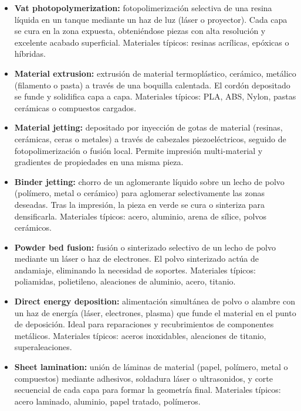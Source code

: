\begin{itemize}
  \item \textbf{Vat photopolymerization:}  
    fotopolimerización selectiva de una resina líquida en un tanque mediante un haz de luz (láser o proyector). Cada capa se cura en la zona expuesta, obteniéndose piezas con alta resolución y excelente acabado superficial. Materiales típicos: resinas acrílicas, epóxicas o híbridas.

  \item \textbf{Material extrusion:}  
    extrusión de material termoplástico, cerámico, metálico (filamento o pasta) a través de una boquilla calentada. El cordón depositado se funde y solidifica capa a capa. Materiales típicos: PLA, ABS, Nylon, pastas cerámicas o compuestos cargados.

  \item \textbf{Material jetting:}  
    depositado por inyección de gotas de material (resinas, cerámicas, ceras o metales) a través de cabezales piezoeléctricos, seguido de fotopolimerización o fusión local. Permite impresión multi-material y gradientes de propiedades en una misma pieza.

  \item \textbf{Binder jetting:}  
    chorro de un aglomerante líquido sobre un lecho de polvo (polímero, metal o cerámico) para aglomerar selectivamente las zonas deseadas. Tras la impresión, la pieza en verde se cura o sinteriza para densificarla. Materiales típicos: acero, aluminio, arena de sílice, polvos cerámicos.

  \item \textbf{Powder bed fusion:}  
    fusión o sinterizado selectivo de un lecho de polvo mediante un láser o haz de electrones. El polvo sinterizado actúa de andamiaje, eliminando la necesidad de soportes. Materiales típicos: poliamidas, polietileno, aleaciones de aluminio, acero, titanio.

  \item \textbf{Direct energy deposition:}  
    alimentación simultánea de polvo o alambre con un haz de energía (láser, electrones, plasma) que funde el material en el punto de deposición. Ideal para reparaciones y recubrimientos de componentes metálicos. Materiales típicos: aceros inoxidables, aleaciones de titanio, superaleaciones.

  \item \textbf{Sheet lamination:}  
    unión de láminas de material (papel, polímero, metal o compuestos) mediante adhesivos, soldadura láser o ultrasonidos, y corte secuencial de cada capa para formar la geometría final. Materiales típicos: acero laminado, aluminio, papel tratado, polímeros.
\end{itemize}

